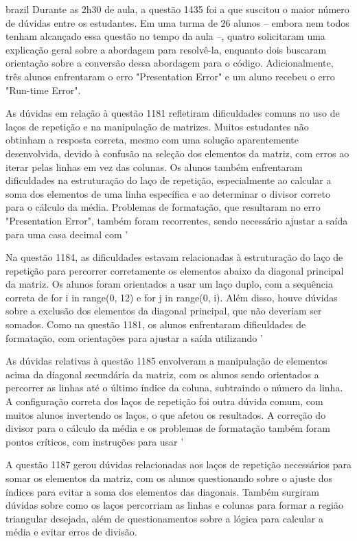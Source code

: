 \begin{otherlanguage*}{brazil}
Durante as 2h30 de aula, a questão 1435 foi a que suscitou o maior número de dúvidas entre os estudantes. Em uma turma de 26 alunos – embora nem todos tenham alcançado essa questão no tempo da aula –, quatro solicitaram uma explicação geral sobre a abordagem para resolvê-la, enquanto dois buscaram orientação sobre a conversão dessa abordagem para o código. Adicionalmente, três alunos enfrentaram o erro "Presentation Error" e um aluno recebeu o erro "Run-time Error".

As dúvidas em relação à questão 1181 refletiram dificuldades comuns no uso de laços de repetição e na manipulação de matrizes. Muitos estudantes não obtinham a resposta correta, mesmo com uma solução aparentemente desenvolvida, devido à confusão na seleção dos elementos da matriz, com erros ao iterar pelas linhas em vez das colunas. Os alunos também enfrentaram dificuldades na estruturação do laço de repetição, especialmente ao calcular a soma dos elementos de uma linha específica e ao determinar o divisor correto para o cálculo da média. Problemas de formatação, que resultaram no erro "Presentation Error", também foram recorrentes, sendo necessário ajustar a saída para uma casa decimal com '%

Na questão 1184, as dificuldades estavam relacionadas à estruturação do laço de repetição para percorrer corretamente os elementos abaixo da diagonal principal da matriz. Os alunos foram orientados a usar um laço duplo, com a sequência correta de for i in range(0, 12) e for j in range(0, i). Além disso, houve dúvidas sobre a exclusão dos elementos da diagonal principal, que não deveriam ser somados. Como na questão 1181, os alunos enfrentaram dificuldades de formatação, com orientações para ajustar a saída utilizando '%

As dúvidas relativas à questão 1185 envolveram a manipulação de elementos acima da diagonal secundária da matriz, com os alunos sendo orientados a percorrer as linhas até o último índice da coluna, subtraindo o número da linha. A configuração correta dos laços de repetição foi outra dúvida comum, com muitos alunos invertendo os laços, o que afetou os resultados. A correção do divisor para o cálculo da média e os problemas de formatação também foram pontos críticos, com instruções para usar '%

A questão 1187 gerou dúvidas relacionadas aos laços de repetição necessários para somar os elementos da matriz, com os alunos questionando sobre o ajuste dos índices para evitar a soma dos elementos das diagonais. Também surgiram dúvidas sobre como os laços percorriam as linhas e colunas para formar a região triangular desejada, além de questionamentos sobre a lógica para calcular a média e evitar erros de divisão.


\end{otherlanguage*}
